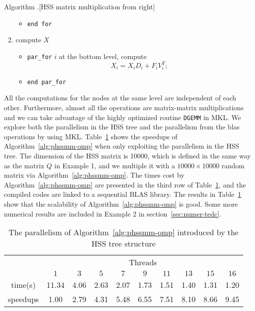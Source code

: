 \documentclass[times]{nlaauth}
\newcounter{algorithm}
\newenvironment{algorithm}{\refstepcounter{algorithm}\vspace{1ex}
  {\sc Algorithm \thealgorithm.}\hspace{0.3em}\parindent=0pt}{\vspace{1ex}}
\begin{document}
\begin{algorithm}[HSS matrix multiplication from right]
\begin{enumerate}[\quad (1)]
\begin{itemize}
       \item \texttt{end for}
       \end{itemize}

     \item compute $X$
       \begin{itemize}
       \item \texttt{par\_for} $i$ at the bottom level, compute
         \begin{equation}
           \label{eq:compt_X}
           X_i = X_iD_i+F_iV_i^T;
         \end{equation}

       \item \texttt{end par\_for}
       \end{itemize}
  \end{enumerate}
\end{algorithm}


All the computations for the nodes at the same level are independent of each other.
Furthermore, almost all the operations are matrix-matrix multiplications and we can take advantage of
the highly optimized routine \texttt{DGEMM} in MKL.
We explore both the parallelism in the HSS tree and the parallelism
from the blas operations by using MKL.
Table~\ref{tab:hss_parallel} shows the speedups of Algorithm~\ref{alg:phssmm-omp} when
only exploiting the parallelism in the HSS tree.
The dimension of the HSS matrix is 10000, which is defined in the same way
as the matrix $Q$ in Example 1, and we multiple it with a $10000\times 10000$
random matrix via Algorithm~\ref{alg:phssmm-omp}.
The times cost by Algorithm~\ref{alg:phssmm-omp} are presented in the third row of Table~\ref{tab:hss_parallel},
and the compiled codes are linked to a sequential BLAS library.
The results in Table~\ref{tab:hss_parallel} show that the scalability of Algorithm~\ref{alg:phssmm-omp} is good.
Some more numerical results are included in Example 2 in section~\ref{sec:numer-tedc}.

\begin{table}[ptbh]
\caption{The parallelism of Algorithm~\ref{alg:phssmm-omp} introduced by the HSS tree structure}\label{tab:hss_parallel}
\begin{center}\begin{tabular}
[c]{|c|c|c|c|c|c|c|c|c|c|} \hline
\multirow{2}{*}{} & \multicolumn{9}{c|}{Threads}  \\ \cline{2-10}
                  & $1$ & $3$  & $5$  & $7$  & $9$  & $11$ & $13$ & $15$ & $16$  \\ \hline \hline
time(s)           &  11.34 & 4.06 & 2.63 & 2.07 & 1.73 & 1.51 & 1.40 & 1.31 & 1.20   \\ \hline
speedups          &  1.00  & 2.79 & 4.31 & 5.48 & 6.55 & 7.51 & 8.10 & 8.66 & 9.45  \\ \hline
\end{tabular}
\end{center}
\end{table}
\end{document}
